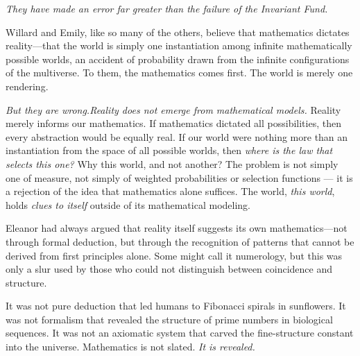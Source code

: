 \textit{They have made an error far greater than the failure of the Invariant Fund.} 

\smallskip


Willard and Emily, like so many of the others, believe that mathematics dictates reality—that the world is simply one instantiation among infinite mathematically possible worlds, an accident of probability drawn from the infinite configurations of the multiverse. To them, the mathematics comes first. The world is merely one rendering.

\smallskip

\textit{But they are wrong.}\textit{Reality does not emerge from mathematical models.} Reality merely informs our mathematics. If mathematics dictated all possibilities, then every abstraction would be equally real. If our world were nothing more than an instantiation from the space of all possible worlds, then \textit{where is the law that selects this one?} Why this world, and not another? The problem is not simply one of measure, not simply of weighted probabilities or selection functions — it is a rejection of the idea that mathematics alone suffices. The world, \textit{this world}, holds \textit{clues to itself} outside of its mathematical modeling.

\smallskip


Eleanor had always argued that reality itself suggests its own mathematics—not through formal deduction, but through the recognition of patterns that cannot be derived from first principles alone. Some might call it numerology, but this was only a slur used by those who could not distinguish between coincidence and structure.

It was not pure deduction that led humans to Fibonacci spirals in sunflowers.  
It was not formalism that revealed the structure of prime numbers in biological sequences.  
It was not an axiomatic system that carved the fine-structure constant into the universe. Mathematics is not slated. \textit{It is revealed.} 

